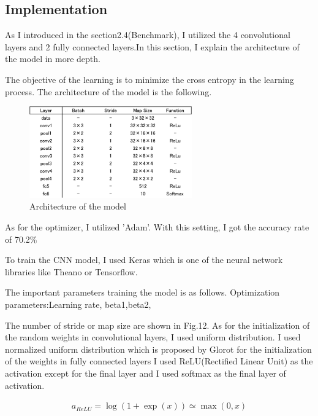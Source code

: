 \subsection{Implementation}


As I introduced in the section2.4(Benchmark), I utilized the 4 convolutional layers and 2 fully connected layers.In this section, I explain the architecture of the model in more depth.

The objective of the learning is to minimize the cross entropy in the learning process.
The architecture of the model is the following.

 \begin{figure}[H]

	\begin{center}
	\includegraphics[width=7cm]{picture/layer_architecture.png}
	\caption{Architecture of the model}
	\end{center}
	\label{fig:9}

\end{figure}


As for the optimizer, I utilized 'Adam'.
With this setting, I got the accuracy rate of 70.2\%

To train the CNN model, I used Keras which is one of the neural network libraries like Theano or Tensorflow.

The important parameters training the model is as follows.
Optimization parameters:Learning rate, beta1,beta2, 

The number of stride or map size are shown in Fig.12.
As for the initialization of the random weights in convolutional layers, I used uniform distribution.
I used normalized uniform distribution which is proposed by Glorot\cite{Glorot} for the initialization of the weights in fully connected layers
I used ReLU(Rectified Linear Unit) as the activation except for the final layer and I used softmax as the final layer of activation.


\begin{eqnarray}
 a_{ReLU}=\log(1+\exp(x)) \simeq \max(0,x)
\end{eqnarray}


